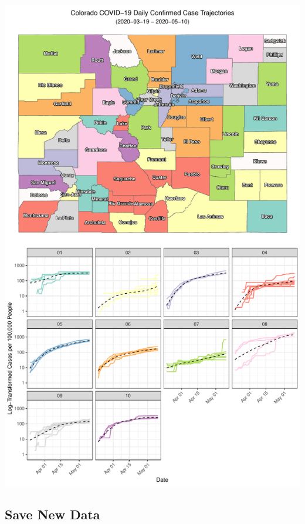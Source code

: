 \documentclass[]{article}
\begin{document}
\includegraphics{figs/county-clusters--log-1.pdf}

\hypertarget{save-new-data}{%
\subsection{Save New Data}\label{save-new-data}}
\end{document}
